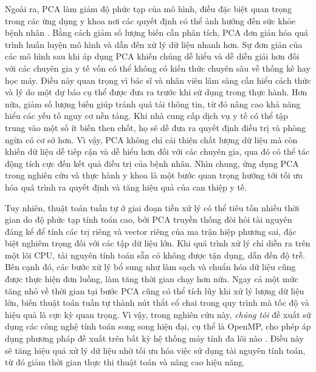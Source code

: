 Ngoài ra, PCA làm giảm độ phức tạp của mô hình, điều đặc biệt quan trọng trong các ứng dụng y khoa nơi các quyết định có thể ảnh hưởng đến sức khỏe bệnh nhân . Bằng cách giảm số lượng biến cần phân tích, PCA đơn giản hóa quá trình huấn luyện mô hình và dẫn đến xử lý dữ liệu nhanh hơn. Sự đơn giản của các mô hình sau khi áp dụng PCA khiến chúng dễ hiểu và dễ diễn giải hơn đối với các chuyên gia y tế vốn có thể không có kiến thức chuyên sâu về thống kê hay học máy. Điều này quan trọng vì bác sĩ và nhân viên lâm sàng cần hiểu cách thức và lý do một dự báo cụ thể được đưa ra trước khi sử dụng trong thực hành. Hơn nữa, giảm số lượng biến giúp tránh quá tải thông tin, từ đó nâng cao khả năng hiểu các yếu tố nguy cơ nền tảng. Khi nhà cung cấp dịch vụ y tế có thể tập trung vào một số ít biến then chốt, họ sẽ dễ đưa ra quyết định điều trị và phòng ngừa có cơ sở hơn. Vì vậy, PCA không chỉ cải thiện chất lượng dữ liệu mà còn khiến dữ liệu dễ tiếp cận và dễ hiểu hơn đối với các chuyên gia, qua đó có thể tác động tích cực đến kết quả điều trị của bệnh nhân. Nhìn chung, ứng dụng PCA trong nghiên cứu và thực hành y khoa là một bước quan trọng hướng tới tối ưu hóa quá trình ra quyết định và tăng hiệu quả của can thiệp y tế.

Tuy nhiên, thuật toán tuần tự ở giai đoạn tiền xử lý có thể tiêu tốn nhiều thời gian do độ phức tạp tính toán cao, bởi PCA truyền thống đòi hỏi tài nguyên đáng kể để tính các trị riêng và vector riêng của ma trận hiệp phương sai, đặc biệt nghiêm trọng đối với các tập dữ liệu lớn. Khi quá trình xử lý chỉ diễn ra trên một lõi CPU, tài nguyên tính toán sẵn có không được tận dụng, dẫn đến độ trễ. Bên cạnh đó, các bước xử lý bổ sung như làm sạch và chuẩn hóa dữ liệu cũng được thực hiện đơn luồng, làm tăng thời gian chạy hơn nữa. Ngay cả một mức tăng nhỏ về thời gian tại bước PCA cũng có thể tích lũy khi xử lý lượng dữ liệu lớn, biến thuật toán tuần tự thành nút thắt cổ chai trong quy trình mà tốc độ và hiệu quả là cực kỳ quan trọng. Vì vậy, trong nghiên cứu này, \textit{chúng tôi} đề xuất sử dụng các công nghệ tính toán song song hiện đại, cụ thể là OpenMP, cho phép áp dụng phương pháp đề xuất trên bất kỳ hệ thống máy tính đa lõi nào . Điều này sẽ tăng hiệu quả xử lý dữ liệu nhờ tối ưu hóa việc sử dụng tài nguyên tính toán, từ đó giảm thời gian thực thi thuật toán và nâng cao hiệu năng.

